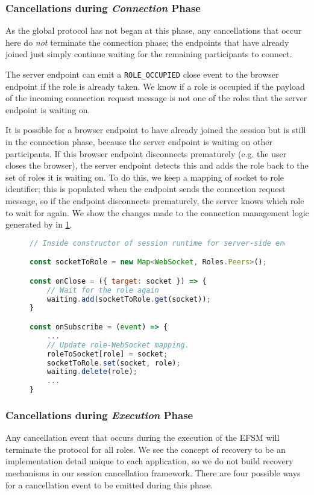 \subsubsection{Cancellations during \textit{Connection} Phase}
As the global protocol has not began at this phase,
any cancellations that occur here do \textit{not} terminate
the connection phase; the endpoints that have already
joined just simply continue waiting for the remaining participants
to connect.

The server endpoint can emit a \texttt{ROLE_OCCUPIED} close event
to the browser endpoint if the role is already taken.
We know if a role is occupied if the payload of the
incoming connection request message is not one of the roles
that the server endpoint is waiting on.

It is possible for a browser endpoint to have already joined
the session but is still in the connection phase, because the
server endpoint is waiting on other participants. If this browser
endpoint disconnects prematurely (e.g. the user closes
the browser), the server endpoint detects this and adds the role
back to the set of roles it is waiting on. To do this, we keep
a mapping of socket to role identifier; this is populated
when the endpoint sends the connection request message,
so if the endpoint disconnects prematurely, the server knows
which role to wait for again. We show the changes made to 
the connection management logic generated by 
in \cref{lst:cancelconnectsvr}.

\begin{figure}[!h]
\begin{lstlisting}[language=javascript]
// Inside constructor of session runtime for server-side endpoint

const socketToRole = new Map<WebSocket, Roles.Peers>();

const onClose = ({ target: socket }) => {
	// Wait for the role again
	waiting.add(socketToRole.get(socket));
}

const onSubscribe = (event) => {
	...
	// Update role-WebSocket mapping.
	roleToSocket[role] = socket;
	socketToRole.set(socket, role);
	waiting.delete(role);
	...
}
\end{lstlisting}
\label{lst:cancelconnectsvr}
\end{figure}


\subsubsection{Cancellations during \textit{Execution} Phase}
Any cancellation event that occurs during the execution of the
EFSM will terminate the protocol for all roles.
We see the concept of recovery to be an implementation detail
unique to each application, so we do not build recovery
mechanisms in our session cancellation framework.
There are four possible ways for a cancellation event
to be emitted during this phase.


